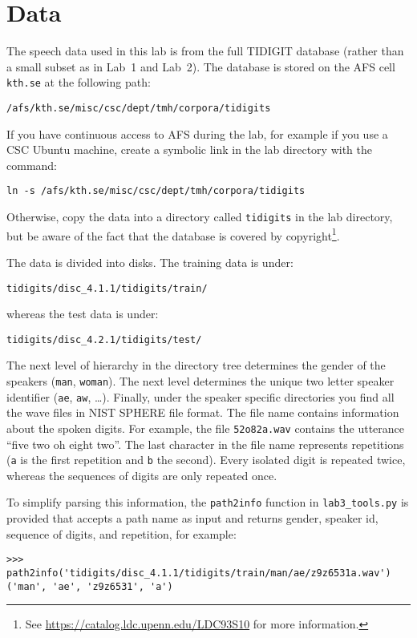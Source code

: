 \documentclass{nada-ten}
\begin{document}

\section{Data}
\label{sec:data}
The speech data used in this lab is from the full TIDIGIT database (rather than a small subset as in Lab~1 and Lab~2). The database is stored on the AFS cell \texttt{kth.se} at the following path:
\begin{verbatim}
/afs/kth.se/misc/csc/dept/tmh/corpora/tidigits
\end{verbatim}
If you have continuous access to AFS during the lab, for example if you use a CSC Ubuntu machine, create a symbolic link in the lab directory with the command:
\begin{verbatim}
ln -s /afs/kth.se/misc/csc/dept/tmh/corpora/tidigits
\end{verbatim}
Otherwise, copy the data into a directory called \texttt{tidigits} in the lab directory, but be aware of the fact that the database is covered by copyright\footnote{See \url{https://catalog.ldc.upenn.edu/LDC93S10} for more information.}.

The data is divided into disks. The training data is under:
\begin{verbatim}
tidigits/disc_4.1.1/tidigits/train/
\end{verbatim}
whereas the test data is under:
\begin{verbatim}
tidigits/disc_4.2.1/tidigits/test/
\end{verbatim}

The next level of hierarchy in the directory tree determines the gender of the speakers (\texttt{man}, \texttt{woman}). The next level determines the unique two letter speaker identifier (\texttt{ae}, \texttt{aw}, \dots). Finally, under the speaker specific directories you find all the wave files in NIST SPHERE file format. The file name contains information about the spoken digits. For example, the file \texttt{52o82a.wav} contains the utterance ``five two oh eight two''. The last character in the file name represents repetitions (\texttt{a} is the first repetition and \texttt{b} the second). Every isolated digit is repeated twice, whereas the sequences of digits are only repeated once.

To simplify parsing this information, the \texttt{path2info} function in \texttt{lab3\_tools.py} is provided that accepts a path name as input and returns gender, speaker id, sequence of digits, and repetition, for example:
\begin{verbatim}
>>> path2info('tidigits/disc_4.1.1/tidigits/train/man/ae/z9z6531a.wav')
('man', 'ae', 'z9z6531', 'a')
\end{verbatim}
\end{document}
